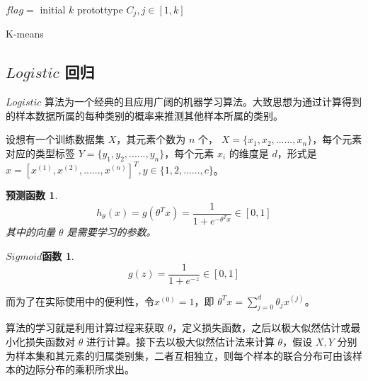 \begin{algorithm}[!h]
\SetAlgoLined
{}
    $flag = $\KwT \;
    initial $k$ protottype $C_j, j \in \left[ 1, k \right]$ \;
\caption[K-means 算法]{K-means}
\label{algo:kmeans}
\end{algorithm}

\subsection{$Logistic$ 回归}
$Logistic$ 算法为一个经典的且应用广阔的机器学习算法。大致思想为通过计算得到的样本数据所属的每种类别的概率来推测其他样本所属的类别。

设想有一个训练数据集 $X$，其元素个数为 $n$ 个， $X = \{ x_1,x_2,......,x_n\}$，每个元素对应的类型标签 $Y=\{ y_1,y_2,......,y_n\}$，每个元素 $x_i$ 的维度是 $d$，形式是 $x=\left[ x^{\left( 1\right)},x^{\left( 2\right)},......,x^{\left( n\right)} \right] ^T, y \in \{ 1,2,......,c\}$。
\newtheorem*{yucehanshu}{预测函数}
\begin{yucehanshu}
    \begin{equation}
        h_{\theta}\left( x\right) =g\left( \theta^Tx\right) =\frac{1}{1+e^{-\theta^Tx}} \in \left[ 0,1 \right]
    \end{equation}
    其中的向量 $\theta$ 是需要学习的参数。
\end{yucehanshu}

\newtheorem*{sigmoid}{$Sigmoid$函数}
\begin{sigmoid}
    \begin{equation}
        g\left( z\right) =\frac{1}{1+e^{-z}} \in \left[ 0,1 \right]
    \end{equation}
\end{sigmoid}

而为了在实际使用中的便利性，令$x^{\left( 0 \right)} =1$，即 $\theta^Tx=\sum_{j=0}^d\theta_jx^{\left( j \right)}$。

算法的学习就是利用计算过程来获取 $\theta$，定义损失函数，之后以极大似然估计或最小化损失函数对 $\theta$ 进行计算。接下去以极大似然估计法来计算 $\theta$，假设 $X, Y$ 分别为样本集和其元素的归属类别集，二者互相独立，则每个样本的联合分布可由该样本的边际分布的乘积所求出。

